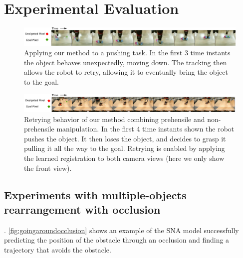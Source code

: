 \section{Experimental Evaluation}

\begin{figure}
    \centering    \includegraphics[width=1.0\textwidth]{images_rfr/push_correction.pdf}
    \caption{\small{Applying our method to a pushing task. In the first 3 time instants the object behaves unexpectedly, moving down. The tracking then allows the robot to retry, allowing it to eventually bring the object to the goal.}}
    \label{fig:push_retry}
\end{figure}

\begin{figure}
	\centering
	\includegraphics[width=1.0\textwidth]{images_rfr/pick_place_plush.pdf}
	\caption{\small{Retrying behavior of our method combining prehensile and non-prehensile manipulation. In the first 4 time instants shown the robot pushes the object. It then loses the object, and decides to grasp it pulling it all the way to the goal. Retrying is enabled by applying the learned registration to both camera views (here we only show the front view).}}
	\label{fig:push_grasp}
\end{figure}

\subsection{Experiments with multiple-objects rearrangement with occlusion}

. \autoref{fig:goingaroundocclusion} shows an example of the SNA model successfully predicting the position of the obstacle through an occlusion and finding a trajectory that avoids the obstacle. 


